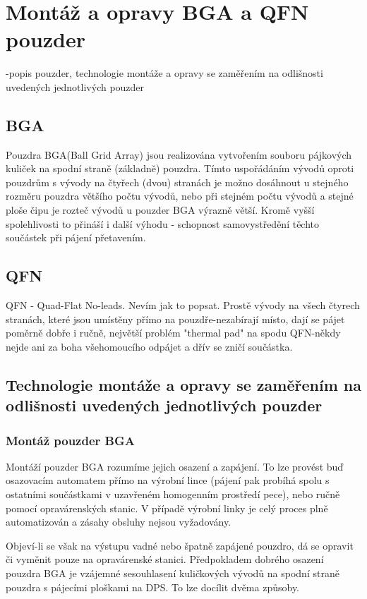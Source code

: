 \section{Montáž a opravy BGA a QFN pouzder}
-popis pouzder, technologie montáže a opravy se zaměřením na odlišnosti uvedených jednotlivých pouzder

\subsection{BGA}
Pouzdra BGA(Ball Grid Array) jsou realizována vytvořením souboru pájkových kuliček na spodní straně (základně) pouzdra. Tímto uspořádáním vývodů oproti pouzdrům s vývody na čtyřech (dvou) stranách je možno dosáhnout u stejného rozměru pouzdra většího počtu vývodů, nebo při
stejném počtu vývodů a stejné ploše čipu je rozteč vývodů u pouzder BGA výrazně větší. Kromě vyšší spolehlivosti to přináší i další výhodu - schopnost samovystředění těchto součástek při pájení přetavením.

\subsection{QFN}
QFN - Quad-Flat No-leads. Nevím jak to popsat. Prostě vývody na všech čtyrech stranách, které jsou umístěny přímo na pouzdře-nezabírají místo, dají se pájet poměrně dobře i ručně, největší problém "thermal pad" na spodu QFN-někdy nejde ani za boha všehomoucího odpájet a dřív se zničí součástka.

\subsection{Technologie montáže a opravy se zaměřením na odlišnosti uvedených jednotlivých pouzder}
\subsubsection{Montáž pouzder BGA}
Montáží pouzder BGA rozumíme jejich osazení a zapájení. To lze provést buď osazovacím
automatem přímo na výrobní lince (pájení pak probíhá spolu s ostatními součástkami v
uzavřeném homogenním prostředí pece), nebo ručně pomocí opravárenských stanic. V případě
výrobní linky je celý proces plně automatizován a zásahy obsluhy nejsou vyžadovány. 

Objeví-li se však na výstupu vadné nebo špatně zapájené pouzdro, dá se opravit či vyměnit pouze na opravárenské stanici. Předpokladem dobrého osazení pouzdra BGA je vzájemné sesouhlasení kuličkových vývodů na spodní straně pouzdra s pájecími ploškami na DPS. To lze docílit dvěma způsoby. 

